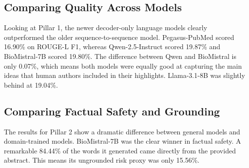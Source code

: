 \documentclass[11pt,a4paper]{article}
\begin{document}
\begin{table}[t]
    \centering
    \caption{Complete Three-Pillar Benchmark Performance on the FIRE MixSub-SciHigh Validation Dataset.}
    \label{tab:results}
    \small
\end{table}

\subsection{Comparing Quality Across Models}
Looking at Pillar 1, the newer decoder-only language models clearly outperformed the older sequence-to-sequence model. Pegasus-PubMed scored 16.90\% on ROUGE-L F1, whereas Qwen-2.5-Instruct scored 19.87\% and BioMistral-7B scored 19.80\%. The difference between Qwen and BioMistral is only 0.07\%, which means both models were equally good at capturing the main ideas that human authors included in their highlights. Llama-3.1-8B was slightly behind at 19.04\%.

\subsection{Comparing Factual Safety and Grounding}
The results for Pillar 2 show a dramatic difference between general models and domain-trained models. BioMistral-7B was the clear winner in factual safety. A remarkable 84.44\% of the words it generated came directly from the provided abstract. This means its ungrounded risk proxy was only 15.56\%.
\end{document}
